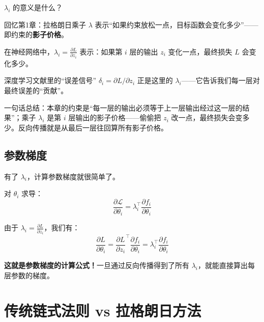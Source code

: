 \begin{physicalmeaning}
$\lambda_i$ 的意义是什么？

回忆第1章：拉格朗日乘子 $\lambda$ 表示``如果约束放松一点，目标函数会变化多少''——即约束的\textbf{影子价格}。

在神经网络中，$\lambda_i = \frac{\partial L}{\partial z_i}$ 表示：如果第 $i$ 层的输出 $z_i$ 变化一点，最终损失 $L$ 会变化多少。

深度学习文献里的``误差信号'' $\delta_i = \partial L/\partial z_i$ 正是这里的 $\lambda_i$——它告诉我们每一层对最终误差的``贡献''。

一句话总结：本章的约束是“每一层的输出必须等于上一层输出经过这一层的结果”；乘子 $\lambda_i$ 是第 $i$ 层输出的影子价格——偷偷把 $z_i$ 改一点，最终损失会变多少。反向传播就是从最后一层往回算所有影子价格。
\end{physicalmeaning}

\subsection{参数梯度}

有了 $\lambda_i$，计算参数梯度就很简单了。

对 $\theta_i$ 求导：
\begin{equation}
\frac{\partial \mathcal{L}}{\partial \theta_i} = \lambda_i^\top \frac{\partial f_i}{\partial \theta_i}
\end{equation}

由于 $\lambda_i = \frac{\partial L}{\partial z_i}$，我们有：
\begin{equation}
\boxed{\frac{\partial L}{\partial \theta_i} = \frac{\partial L}{\partial z_i}^\top \frac{\partial f_i}{\partial \theta_i} = \lambda_i^\top \frac{\partial f_i}{\partial \theta_i}}
\end{equation}

\textbf{这就是参数梯度的计算公式！}一旦通过反向传播得到了所有 $\lambda_i$，就能直接算出每层参数的梯度。

\section{传统链式法则 vs 拉格朗日方法}

